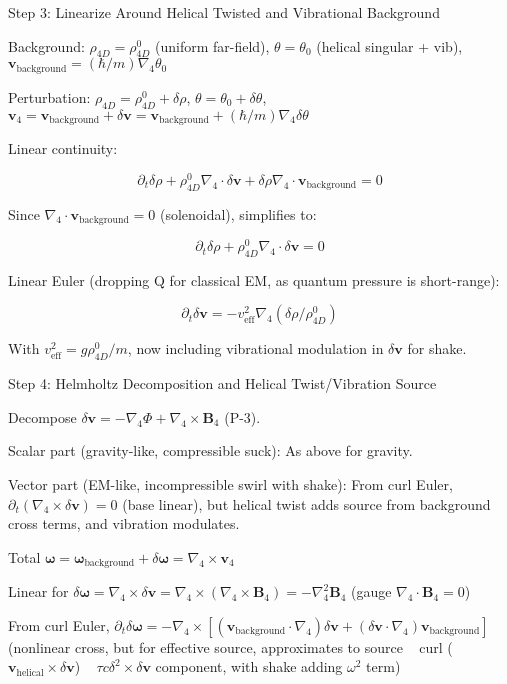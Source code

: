 Step 3: Linearize Around Helical Twisted and Vibrational Background

Background: $\rho_{4D} = \rho_{4D}^0$ (uniform far-field), $\theta = \theta_0$ (helical singular + vib), $\mathbf{v}_{\text{background}} = (\hbar / m) \nabla_4 \theta_0$

Perturbation: $\rho_{4D} = \rho_{4D}^0 + \delta\rho$, $\theta = \theta_0 + \delta\theta$, $\mathbf{v}_4 = \mathbf{v}_{\text{background}} + \delta\mathbf{v} = \mathbf{v}_{\text{background}} + (\hbar / m) \nabla_4 \delta\theta$

Linear continuity:

\[ \partial_t \delta \rho + \rho_{4D}^0 \nabla_4 \cdot \delta \mathbf{v} + \delta \rho \nabla_4 \cdot \mathbf{v}_{\text{background}} = 0 \]

Since $\nabla_4 \cdot \mathbf{v}_{\text{background}} = 0$ (solenoidal), simplifies to:

\[ \partial_t \delta \rho + \rho_{4D}^0 \nabla_4 \cdot \delta \mathbf{v} = 0 \]

Linear Euler (dropping Q for classical EM, as quantum pressure is short-range):

\[ \partial_t \delta \mathbf{v} = - v_{\text{eff}}^2 \nabla_4 (\delta \rho / \rho_{4D}^0) \]

With $v_{\text{eff}}^2 = g \rho_{4D}^0 / m$, now including vibrational modulation in $\delta \mathbf{v}$ for shake.

Step 4: Helmholtz Decomposition and Helical Twist/Vibration Source

Decompose $\delta\mathbf{v} = - \nabla_4 \Phi + \nabla_4 \times \mathbf{B}_4$ (P-3).

Scalar part (gravity-like, compressible suck): As above for gravity.

Vector part (EM-like, incompressible swirl with shake): From curl Euler, $\partial_t (\nabla_4 \times \delta\mathbf{v}) = 0$ (base linear), but helical twist adds source from background cross terms, and vibration modulates.

Total $\boldsymbol{\omega} = \boldsymbol{\omega}_{\text{background}} + \delta\boldsymbol{\omega} = \nabla_4 \times \mathbf{v}_4$

Linear for $\delta\boldsymbol{\omega} = \nabla_4 \times \delta\mathbf{v} = \nabla_4 \times (\nabla_4 \times \mathbf{B}_4) = - \nabla_4^2 \mathbf{B}_4$ (gauge $\nabla_4 \cdot \mathbf{B}_4 = 0$)

From curl Euler, $\partial_t \delta\boldsymbol{\omega} = - \nabla_4 \times [(\mathbf{v}_{\text{background}} \cdot \nabla_4) \delta\mathbf{v} + (\delta\mathbf{v} \cdot \nabla_4) \mathbf{v}_{\text{background}}]$ (nonlinear cross, but for effective source, approximates to source ~ curl ($\mathbf{v}_{\text{helical}} \times \delta\mathbf{v}$) ~ $\tau c \delta^2 \times \delta\mathbf{v}$ component, with shake adding $\omega^2$ term)

